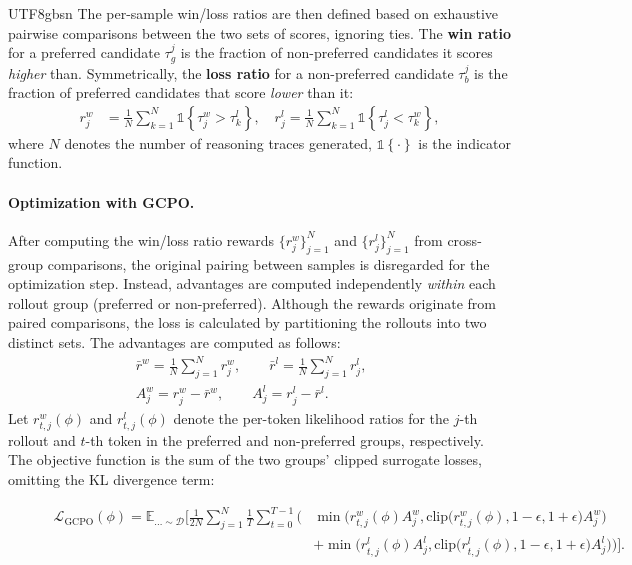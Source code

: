 \documentclass{llmxive}
\providecommand{\Ind}[1]{\mathds{1}\!\left\{#1\right\}}
\begin{document}
\begin{CJK*}{UTF8}{gbsn}
The per-sample win/loss ratios are then defined based on exhaustive pairwise comparisons between the two sets of scores, ignoring ties. The \textbf{win ratio} for a preferred candidate $\tau_g^j$ is the fraction of non-preferred candidates it scores \emph{higher} than. Symmetrically, the \textbf{loss ratio} for a non-preferred candidate $\tau_b^j$ is the fraction of preferred candidates that score \emph{lower} than it:
\begin{align}
r^w_j &= \frac{1}{N}\sum_{k=1}^{N} \Ind{\tau^w_j > \tau^l_k},\quad r^l_j = \frac{1}{N}\sum_{k=1}^{N} \Ind{\tau^l_j < \tau^w_k},
\end{align}
where $N$ denotes the number of reasoning traces generated, $\Ind{\cdot}$ is the indicator function.

\paragraph{Optimization with GCPO.}
After computing the win/loss ratio rewards $\{r^w_j\}_{j=1}^{N}$ and $\{r^l_j\}_{j=1}^{N}$ from cross-group comparisons, the original pairing between samples is disregarded for the optimization step. Instead, advantages are computed independently \emph{within} each rollout group (preferred or non-preferred). Although the rewards originate from paired comparisons, the loss is calculated by partitioning the rollouts into two distinct sets. The advantages are computed as follows:
\begin{align}
& \bar{r}^w = \frac{1}{N}\sum_{j=1}^{N} r^w_j, \qquad
\bar{r}^l = \frac{1}{N}\sum_{j=1}^{N} r^l_j, 
\qquad \nonumber \\
& A^w_j = r^w_j - \bar{r}^w, 
\qquad
A^l_j = r^l_j - \bar{r}^l.
\end{align}
Let $r_{t,j}^{w}(\phi)$ and $r_{t,j}^{l}(\phi)$ denote the per-token likelihood ratios for the $j$-th rollout and $t$-th token in the preferred and non-preferred groups, respectively. The objective function is the sum of the two groups' clipped surrogate losses, omitting the KL divergence term:
\begin{figure}[t]
\vspace{-1.5em} %
\begin{equation}
\label{eq:gcpo_final}
\begin{split}
    \mathcal{L}_{\text{GCPO}}(\phi) = \mathbb{E}_{\dots\sim\mathcal{D}} \Bigg[ \frac{1}{2N} \sum_{j=1}^{N} \frac{1}{T} \sum_{t=0}^{T-1} \bigg( 
    &\min\Big( r_{t, j}^{w}(\phi)A^w_j, \text{clip}\big(r_{t, j}^{w}(\phi), 1-\epsilon, 1+\epsilon\big)A^w_j \Big) \\
    &+ \min\Big( r_{t,j}^{l}(\phi)A^l_j, \text{clip}\big(r_{t,j}^{l}(\phi), 1-\epsilon, 1+\epsilon\big)A^l_j \Big)
    \bigg) \Bigg].
\end{split}
\end{equation}
\vspace{-1.5em} %
\end{figure}



\end{CJK*}
\end{document}
